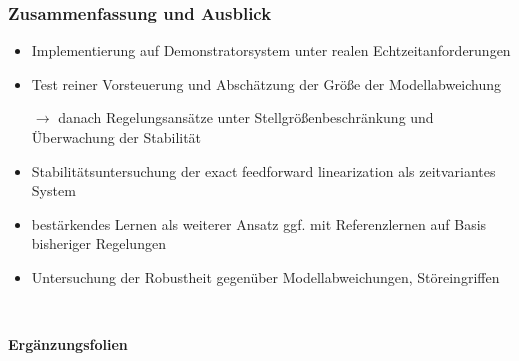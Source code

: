 \documentclass[
	ngerman,
	10pt,				%
	aspectratio=169 	%
]{beamer}
\newcommand{\backupbegin}{
   \newcounter{finalframe}
   \setcounter{finalframe}{\value{framenumber}}
}
\begin{document}

\begin{frame}[label=Ausblick]
	\frametitle{Zusammenfassung und Ausblick}
	\begin{itemize}
		\item Implementierung auf Demonstratorsystem unter realen Echtzeitanforderungen
		\pause
		\item Test reiner Vorsteuerung und Abschätzung der Größe der Modellabweichung
		\pause
		\item[$\rightarrow$] danach Regelungsansätze unter Stellgrößenbeschränkung und Überwachung der Stabilität
		\pause 
		\item Stabilitätsuntersuchung der exact feedforward linearization als zeitvariantes System
		\pause
		\item bestärkendes Lernen als weiterer Ansatz ggf. mit Referenzlernen auf Basis bisheriger Regelungen
		\pause
		\item Untersuchung der Robustheit gegenüber Modellabweichungen, Störeingriffen
		
	\end{itemize}
	
\end{frame}


\begin{frame}[fragile,label=Ergaenzungsfolien]{~}
	\begin{center}
		{\huge \textbf{Ergänzungsfolien}} 
	\end{center}
	
\end{frame}

\backupbegin

\end{document}
